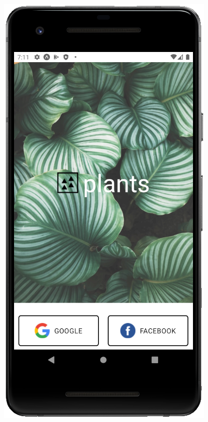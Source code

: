 \documentclass[10pt]{article}
\begin{document}
    \begin{figure}[h]
     \centering
     \begin{minipage}[h]{0.4\textwidth}
         \centering
         \includegraphics[width=\textwidth]{resources/screens/login.PNG}

\end{minipage}
\end{figure}
\end{document}
